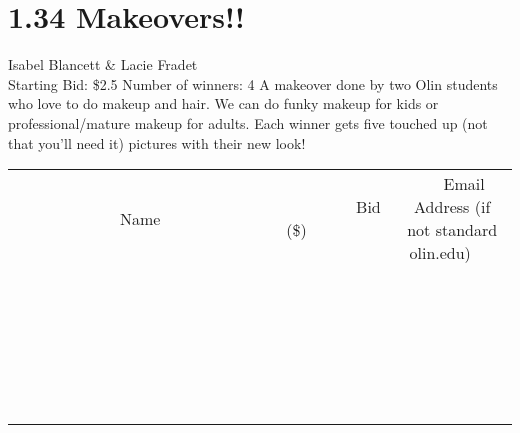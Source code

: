 \documentclass[11pt]{article}
\begin{document}
\section*{1.34 Makeovers!!}
Isabel Blancett \& Lacie Fradet
\\
Starting Bid: \$2.5
\newline
Number of winners: 4
\newline
A makeover done by two Olin students who love to do makeup and hair.  We can do funky makeup for kids or professional/mature makeup for adults.  Each winner gets five touched up (not that you'll need it) pictures with their new look!
\\[6ex]
\begin{tabular}{c c c}
~~~~~~~~~~~~~Name~~~~~~~~~~~~~ & ~~~~~~~~~Bid (\$)~~~~~~~~~  & ~~~Email Address (if not standard olin.edu)~~~\\
 & & \\
\hline
 & & \\
\hline
 & & \\
\hline
 & & \\
\hline
 & & \\
\hline
 & & \\
\hline
 & & \\
\hline
 & & \\
\hline
 & & \\
\hline
 & & \\
\hline
 & & \\
\hline
 & & \\
\hline
 & & \\
\hline
 & & \\
\hline
 & & \\
\hline
 & & \\
\hline
 & & \\
\hline
 & & \\
\hline
 & & \\
\hline
 & & \\
\hline
 & & \\
\hline
 & & \\
\hline
 & & \\
\hline
 & & \\
\hline
 & & \\
\hline
 & & \\
\hline
\end{tabular}
\newpage
\end{document}
